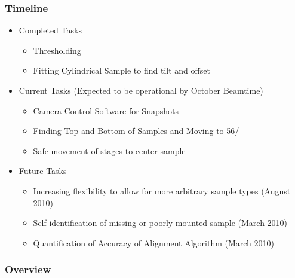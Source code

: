 \subsubsection*{Timeline}
\begin{itemize}
 	\item Completed Tasks
	\begin{itemize}
		\item Thresholding
		\item Fitting Cylindrical Sample to find tilt and offset
	\end{itemize}
	\item Current Tasks (Expected to be operational by October Beamtime)
	\begin{itemize}
		\item Camera Control Software for Snapshots
		\item Finding Top and Bottom of Samples and Moving to 56/%
		\item Safe movement of stages to center sample
	\end{itemize}
	\item Future Tasks
	\begin{itemize}
		\item Increasing flexibility to allow for more arbitrary sample types (August 2010)
		\item Self-identification of missing or poorly mounted sample (March 2010)
		\item Quantification of Accuracy of Alignment Algorithm (March 2010)
	\end{itemize}
\end{itemize}
\subsubsection*{Overview}

